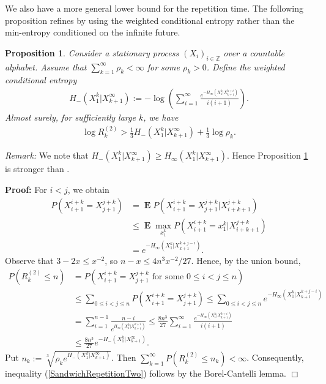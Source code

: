 \documentclass[a4paper,12pt]{article}
\newcommand{\okra}[1]{\left( #1 \right)}
\DeclareMathOperator{\mean}{\mathbf{E}}
\newtheorem{proposition}{Proposition}
\newenvironment*{proof}{\begin{trivlist}\item[]
\noindent\textbf{Proof:}}{$\Box$\par\end{trivlist}}
\begin{document}
We also have a more general lower bound for the repetition time.  The
following proposition refines \citep[Theorem 9.25]{Debowski21} by
using the weighted conditional entropy rather than the min-entropy
conditioned on the infinite future.
\begin{proposition}
  \label{theoSandwichRepetitionTwo}
  Consider a stationary process $(X_i)_{i\in\mathbb{Z}}$ over a
  countable alphabet. Assume that $\sum_{k=1}^\infty \rho_k<\infty$
  for some $\rho_k>0$. Define the weighted conditional entropy
  \begin{align}
    H_-(X_1^k|X_{k+1}^\infty):=-\log \okra{
    \sum_{i=1}^\infty\frac{e^{-H_\infty(X_1^k|X_{k+1}^{k+i})}}{i(i+1)}}.
  \end{align}
  Almost surely, for sufficiently large $k$, we have
  \begin{align}
    \label{SandwichRepetitionTwo}
    \log R^{(2)}_k> \frac{1}{3}H_-(X_1^k|X_{k+1}^\infty)
    +\frac{1}{3}\log\rho_k
    .
  \end{align}
\end{proposition}
\emph{Remark:} We note that
$H_-(X_1^k|X_{k+1}^\infty)\ge
H_\infty(X_1^k|X_{k+1}^\infty)$. Hence Proposition
\ref{theoSandwichRepetitionTwo} is stronger than \citep[Theorem
9.25]{Debowski21}.
\begin{proof}
  For $i<j$, we obtain 
\begin{align}
  P(X_{i+1}^{i+k}=X_{j+1}^{j+k})
  &=
    \mean
    P(X_{i+1}^{i+k}=X_{j+1}^{j+k}|X_{i+k+1}^{j+k})
    \nonumber\\
  &\le
    \mean \max_{x_1^k} P(X_{i+1}^{i+k}=x_1^k|X_{i+k+1}^{j+k})
    \nonumber\\
  &=
    e^{-H_\infty(X_1^k|X_{k+1}^{k+j-i})}
    .
\end{align}
Observe that $3-2x\le x^{-2}$, so $n-x\le 4n^3x^{-2}/27$.
Hence, by the union bound,
\begin{align}
  P(R^{(2)}_k\le n)
  &= P\okra{X_{i+1}^{i+k}=X_{j+1}^{j+k} \text{ for some }
    0\le i<j\le n}
    \nonumber\\
  &\le \sum_{0\le i<j\le n} P(X_{i+1}^{i+k}=X_{j+1}^{j+k})
    \le \sum_{0\le i<j\le n}  e^{-H_\infty(X_1^k|X_{k+1}^{k+j-i})}
    \nonumber\\
  &= \sum_{i=1}^{n-1}
    \frac{n-i}{e^{H_\infty(X_1^k|X_{k+1}^{k+i})}}
    \le \frac{8n^3}{27}
    \sum_{i=1}^\infty\frac{e^{-H_\infty(X_1^k|X_{k+1}^{k+i})}}{i(i+1)}
    \nonumber\\
  &\le \frac{8n^3}{27} e^{-H_-(X_1^k|X_{k+1}^\infty)}.
\end{align}
Put $n_k:=\sqrt[3]{\rho_k e^{H_-(X_1^k|X_{k+1}^\infty)}}$. Then
$\sum_{k=1}^\infty P(R^{(2)}_k\le n_k)<\infty$.  Consequently,
inequality (\ref{SandwichRepetitionTwo}) follows by the
Borel-Cantelli lemma.
\end{proof}
\end{document}
